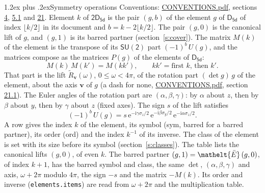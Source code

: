 \documentclass[10pt,a4paper]{article}
\makeatletter
\renewcommand\section{\@startsection{section}{1}{\z@}{-3ex plus -1ex minus -.2ex}%
  {1.2ex plus .2ex}{\normalfont\large\sffamily\bfseries\color{parttitle}}}
\numberwithin{equation}{section}
\newcommand{\eltfont}[1]{{\let\sigma\eltsigma\mathelt{#1}}}
\newcommand{\grp}[1]{\mathsf{#1}}
\newcommand{\elt}[1]{\eltfont{#1}}
\newcommand{\vv}{\mathbf{v}}
\newcommand{\iunit}{\mathrm{i}}
\newcommand{\expe}{\mathrm{e}}
\newcommand{\barred}[1]{\bar{#1}}
\newcommand{\lift}[1]{\tilde{#1}}
\newcommand{\pauli}[1]{\sigma_{#1}}
\makeatother
\begin{document}
\section{Symmetry operations}\label{s:elements}
Conventions: \href{../../CONVENTIONS.pdf}{CONVENTIONS.pdf}, sections \href{../../../rotation/CONVENTIONS.pdf\#conv.4}{4}, \href{../../../rotation/CONVENTIONS.pdf\#conv.5.1}{5.1} and \href{../../CONVENTIONS.pdf\#conv.21}{21}.
\leavevmode\label{n:index.element}\label{n:element.g}Element $k$ of $\grp{2D_{5d}}$ is the pair $(g, b)$ of the element $g$ of \href{../../../rotation/data/pdf/D5d.pdf}{$\grp{D_{5d}}$} of index $\lfloor k/2\rfloor$ in its document and $b = k - 2\lfloor k/2\rfloor$. The pair $(g, 0)$ is the canonical lift of $g$, and $(g, 1)$ is its barred partner (section~\ref{s:cover}). \label{n:matrix.element.pin}\label{n:matrix.element}The matrix $M(k)$ of the element is the transpose of its $\grp{SU(2)}$ part $(-1)^{b}\,U(g)$, and the matrices compose as the matrices $P(g)$ of the elements of $\grp{D_{5d}}$:
\begin{equation}\label{e:mprod}M(k)\,M(k') = M(kk'),\qquad kk' = \text{first } k\text{, then } k'.\end{equation}
\leavevmode\label{n:angle.omega}\label{n:vector.axis}\label{n:vector.pole}That part is the lift $\lift{R}_{\vv}(\omega)$, $0 \le \omega < 4\pi$, of the rotation part $(\det g)\,g$ of the element, about the axis $\vv$ of $g$ (a dash for none, \href{../../CONVENTIONS.pdf}{CONVENTIONS.pdf}, section \href{../../CONVENTIONS.pdf\#conv.21.1}{21.1}). \label{n:angle.euler.alpha}\label{n:angle.euler.beta}\label{n:angle.euler.gamma}\label{n:vector.coordinates}The Euler angles of the rotation part are $(\alpha,\beta,\gamma)$: by $\alpha$ about $z$, then by $\beta$ about $y$, then by $\gamma$ about $z$ (fixed axes). \label{n:local.euler.sign}The sign $s$ of the lift satisfies
\begin{equation}\label{e:euler}(-1)^{b}\,U(g) = s\,\expe^{-\iunit\gamma\pauli{z}/2}\,\expe^{-\iunit\beta\pauli{y}/2}\,\expe^{-\iunit\alpha\pauli{z}/2}.\end{equation}
\leavevmode\label{n:index.element.inverse}\label{n:head.sym}\label{n:head.ord}A row gives the index $k$ of the element, its symbol (sym, barred for a barred partner), its order (ord) and the index $k^{-1}$ of its inverse. \label{n:head.class}The class of the element is set with its size before its symbol (section~\ref{s:classes}).
The table lists the canonical lifts $(g, 0)$, of even $k$. The barred partner $(g, 1) = \elt{\barred{E}}\,(g, 0)$, of index $k + 1$, has the barred symbol and class, the same $\det$, $(\alpha,\beta,\gamma)$ and axis, $\omega + 2\pi$ modulo $4\pi$, the sign $-s$ and the matrix $-M(k)$. Its order and inverse (\texttt{elements.items}) are read from $\omega + 2\pi$ and the multiplication table.
\end{document}
